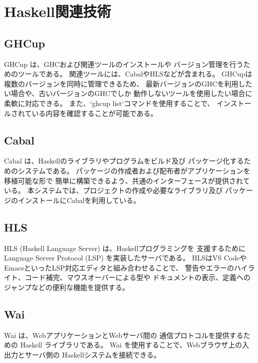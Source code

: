 \documentclass{cssspaper}
\begin{document}
        \section{Haskell関連技術}
            \subsection{GHCup}  
            GHCup \cite{10} は、GHCおよび関連ツールのインストールや
            バージョン管理を行うためのツールである。  
            関連ツールには、CabalやHLSなどが含まれる。  
            GHCupは複数のバージョンを同時に管理できるため、
            最新バージョンのGHCを利用したい場合や、古いバージョンのGHCでしか
            動作しないツールを使用したい場合に柔軟に対応できる。  
            また、`ghcup list`コマンドを使用することで、
            インストールされている内容を確認することが可能である。

            \subsection{Cabal}  
            Cabal \cite{11} は、Haskellのライブラリやプログラムをビルド及び
            パッケージ化するためのシステムである。  
            パッケージの作成者および配布者がアプリケーションを移植可能な形で
            簡単に構築できるよう、共通のインターフェースが提供されている。  
            本システムでは、プロジェクトの作成や必要なライブラリ及び
            パッケージのインストールにCabalを利用している。

            \subsection{HLS}
            HLS (Haskell Language Server) \cite{12} は、Haskellプログラミングを
            支援するために Language Server Protocol (LSP) を実装したサーバである。  
            HLSはVS CodeやEmacsといったLSP対応エディタと組み合わせることで、
            警告やエラーのハイライト、コード補完、マウスオーバーによる型や
            ドキュメントの表示、定義へのジャンプなどの便利な機能を提供する。

            \subsection{Wai}  
            Wai \cite{13} は、WebアプリケーションとWebサーバ間の
            通信プロトコルを提供するための Haskell ライブラリである。  
            Wai を使用することで、Webブラウザ上の入出力とサーバ側の
            Haskellシステムを接続できる。
\end{document}
